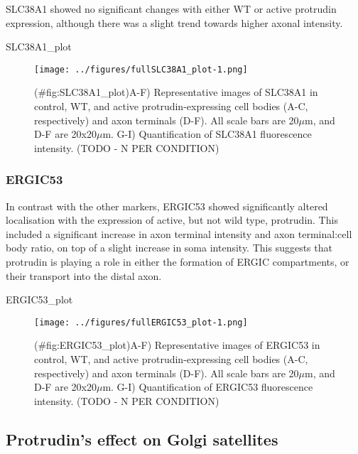 \documentclass[
  12pt,
  a4paper,
]{book}
\newenvironment{Shaded}{\begin{snugshade}}{\end{snugshade}}
\newcommand{\NormalTok}[1]{#1}
\begin{document}
SLC38A1 showed no significant changes with either WT or active protrudin expression, although there was a slight trend towards higher axonal intensity.

\begin{Shaded}
\begin{Highlighting}[]
\NormalTok{SLC38A1\_plot}
\end{Highlighting}
\end{Shaded}

\begin{figure}
\centering
\texttt{[image: ../figures/fullSLC38A1\_plot-1.png]}
\caption{(\#fig:SLC38A1\_plot)A-F) Representative images of SLC38A1 in control, WT, and active protrudin-expressing cell bodies (A-C, respectively) and axon terminals (D-F). All scale bars are 20\(\mu\)m, and D-F are 20x20\(\mu\)m. G-I) Quantification of SLC38A1 fluorescence intensity. (TODO - N PER CONDITION)}
\end{figure}

\hypertarget{ergic53}{%
\subsubsection{ERGIC53}\label{ergic53}}

In contrast with the other markers, ERGIC53 showed significantly altered localisation with the expression of active, but not wild type, protrudin. This included a significant increase in axon terminal intensity and axon terminal:cell body ratio, on top of a slight increase in soma intensity. This suggests that protrudin is playing a role in either the formation of ERGIC compartments, or their transport into the distal axon.

\begin{Shaded}
\begin{Highlighting}[]
\NormalTok{ERGIC53\_plot}
\end{Highlighting}
\end{Shaded}

\begin{figure}
\centering
\texttt{[image: ../figures/fullERGIC53\_plot-1.png]}
\caption{(\#fig:ERGIC53\_plot)A-F) Representative images of ERGIC53 in control, WT, and active protrudin-expressing cell bodies (A-C, respectively) and axon terminals (D-F). All scale bars are 20\(\mu\)m, and D-F are 20x20\(\mu\)m. G-I) Quantification of ERGIC53 fluorescence intensity. (TODO - N PER CONDITION)}
\end{figure}

\hypertarget{protrudins-effect-on-golgi-satellites}{%
\subsection{Protrudin's effect on Golgi satellites}\label{protrudins-effect-on-golgi-satellites}}
\end{document}
